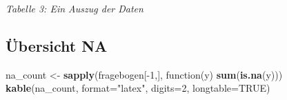 \documentclass[]{article}
\newenvironment{Shaded}{\begin{snugshade}}{\end{snugshade}}
\newcommand{\KeywordTok}[1]{\textcolor[rgb]{0.13,0.29,0.53}{\textbf{{#1}}}}
\newcommand{\DataTypeTok}[1]{\textcolor[rgb]{0.13,0.29,0.53}{{#1}}}
\newcommand{\DecValTok}[1]{\textcolor[rgb]{0.00,0.00,0.81}{{#1}}}
\newcommand{\StringTok}[1]{\textcolor[rgb]{0.31,0.60,0.02}{{#1}}}
\newcommand{\OtherTok}[1]{\textcolor[rgb]{0.56,0.35,0.01}{{#1}}}
\newcommand{\NormalTok}[1]{{#1}}
\begin{document}
\begin{center}
\textit{Tabelle 3: Ein Auszug der Daten}
\bigskip
\end{center}

\subsection{Übersicht NA}\label{ubersicht-na}

\begin{Shaded}
\begin{Highlighting}[]
\NormalTok{na_count <-}\StringTok{ }\KeywordTok{sapply}\NormalTok{(fragebogen[-}\DecValTok{1}\NormalTok{,], function(y) }\KeywordTok{sum}\NormalTok{(}\KeywordTok{is.na}\NormalTok{(y)))}
\KeywordTok{kable}\NormalTok{(na_count, }\DataTypeTok{format=}\StringTok{"latex"}\NormalTok{, }\DataTypeTok{digits=}\DecValTok{2}\NormalTok{, }\DataTypeTok{longtable=}\OtherTok{TRUE}\NormalTok{)}
\end{Highlighting}
\end{Shaded}
\end{document}
